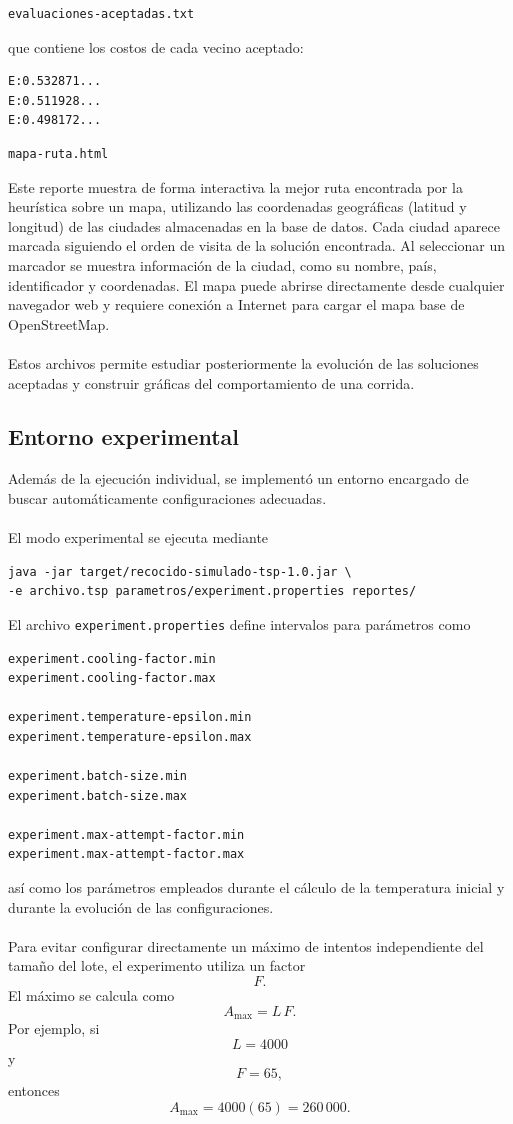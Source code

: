 \documentclass[12pt]{article}
\begin{document}
\begin{verbatim}
evaluaciones-aceptadas.txt
\end{verbatim}
que contiene los costos de cada vecino aceptado:
\begin{verbatim}
E:0.532871...
E:0.511928...
E:0.498172...
\end{verbatim}
\begin{verbatim}
mapa-ruta.html
\end{verbatim}
Este reporte muestra de forma interactiva la mejor ruta encontrada por la heurística sobre un mapa, utilizando las coordenadas geográficas (latitud y longitud) de las ciudades almacenadas en la base de datos.
Cada ciudad aparece marcada siguiendo el orden de visita de la solución encontrada. Al seleccionar un marcador se muestra información de la ciudad, como su nombre, país, identificador y coordenadas.
El mapa puede abrirse directamente desde cualquier navegador web y requiere conexión a Internet para cargar el mapa base de OpenStreetMap.
\\\\
Estos archivos permite estudiar posteriormente la evolución de las soluciones
aceptadas y construir gráficas del comportamiento de una corrida.

\subsection{Entorno experimental}

Además de la ejecución individual, se implementó un entorno encargado de
buscar automáticamente configuraciones adecuadas.
\\\\
El modo experimental se ejecuta mediante
\begin{verbatim}
java -jar target/recocido-simulado-tsp-1.0.jar \
-e archivo.tsp parametros/experiment.properties reportes/
\end{verbatim}
El archivo \texttt{experiment.properties} define intervalos para parámetros
como
\begin{verbatim}
experiment.cooling-factor.min
experiment.cooling-factor.max

experiment.temperature-epsilon.min
experiment.temperature-epsilon.max

experiment.batch-size.min
experiment.batch-size.max

experiment.max-attempt-factor.min
experiment.max-attempt-factor.max
\end{verbatim}
así como los parámetros empleados durante el cálculo de la temperatura
inicial y durante la evolución de las configuraciones.
\\\\
Para evitar configurar directamente un máximo de intentos independiente del
tamaño del lote, el experimento utiliza un factor
\[
    F.
\]
El máximo se calcula como
\[
    A_{\max}=L\,F.
\]
Por ejemplo, si
\[
    L=4000
\]
y
\[
    F=65,
\]
entonces
\[
    A_{\max}
    =
    4000(65)
    =
    260\,000.
\]
\end{document}

